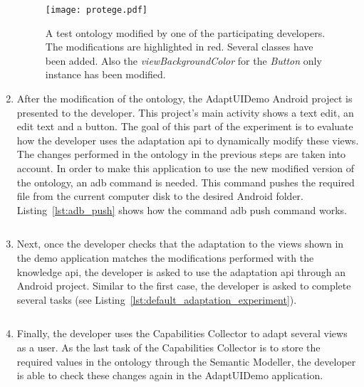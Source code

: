 \begin{enumerate}
  \begin{figure}
  \centering
  \texttt{[image: protege.pdf]}
  \caption{A test ontology modified by one of the participating developers. 
  The modifications are highlighted in red. Several classes have been added. 
  Also the \textit{viewBackgroundColor} for the \textit{Button} only instance 
  has been modified.}
  \label{fig:protege}
  \end{figure}
  
  \item After the modification of the ontology, the AdaptUIDemo Android project 
  is presented to the developer. This project's main activity shows a text edit, 
  an edit text and a button. The goal of this part of the experiment is to evaluate
  how the developer uses the adaptation \ac{api} to dynamically modify these views.
  The changes performed in the ontology in the previous steps are taken into account. 
  In order to make this application to use the new modified version of the ontology, 
  an \acs{adb} command is needed. This command pushes the required file from the 
  current computer disk to the desired Android folder. Listing~\ref{lst:adb_push} 
  shows how the command \acs{adb} push command works.
  
  \inputminted[linenos=true, fontsize=\footnotesize, frame=lines]{java}{5_experiments_and_results/adb_push.java}
  
  \item Next, once the developer checks that the adaptation to the views shown
  in the demo application matches the modifications performed with the knowledge 
  \ac{api}, the developer is asked to use the adaptation \ac{api} through an
  Android project. Similar to the first case, the developer is asked to complete
  several tasks (see Listing~\ref{lst:default_adaptation_experiment}).

  \inputminted[linenos=true, fontsize=\footnotesize, frame=lines]{java}{5_experiments_and_results/default_adaptation_experiment.java}
  
  \item Finally, the developer uses the Capabilities Collector to adapt several
  views as a user. As the last task of the Capabilities Collector is to store the
  required values in the ontology through the Semantic Modeller, the developer 
  is able to check these changes again in the AdaptUIDemo application.
  
\end{enumerate}



